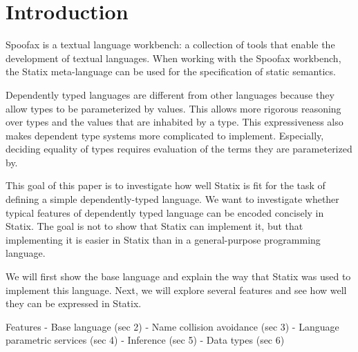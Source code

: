 
\chapter{\label{chap:introduction}Introduction}

Spoofax is a textual language workbench: \label{key}a collection of tools that enable the development of textual languages. When working with the Spoofax workbench, the Statix meta-language can be used for the specification of static semantics. 

Dependently typed languages are different from other languages because they allow types to be parameterized by values. This allows more rigorous reasoning over types and the values that are inhabited by a type. This expressiveness also makes dependent type systems more complicated to implement. Especially, deciding equality of types requires evaluation of the terms they are parameterized by. 

This goal of this paper is to investigate how well Statix is fit for the task of defining a simple dependently-typed language. We want to investigate whether typical features of dependently typed language can be encoded concisely in Statix. The goal is not to show that Statix can implement it, but that implementing it is easier in Statix than in a general-purpose programming language. 

We will first show the base language and explain the way that Statix was used to implement this language. Next, we will explore several features and see how well they can be expressed in Statix. 

Features
- Base language (sec 2)
- Name collision avoidance (sec 3)
- Language parametric services (sec 4)
- Inference (sec 5)
- Data types (sec 6)
